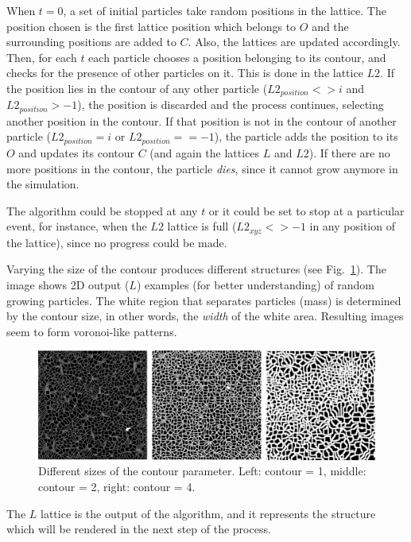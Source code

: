 \documentclass[oneside,a4paper,english,links]{amca}
\begin{document}
When $t = 0$, a set of initial particles take random positions in the lattice. The position chosen is the first lattice position which belongs to $O$ and the surrounding positions are added to $C$. Also, the lattices are updated accordingly. Then, for each $t$ each particle chooses a position belonging to its contour, and checks for the presence of other particles on it. This is done in the lattice $L2$. If the position lies in the contour of any other particle ($L2_{position} <> i$ and $L2_{position} > -1$), the position is discarded and the process continues, selecting another position in the contour. If that position is not in the contour of another particle ($L2_{position} = i$ or $L2_{position} == -1$), the particle adds the position to its $O$ and updates its contour $C$ (and again the lattices $L$ and $L2$). If there are no more positions in the contour, the particle {\em dies}, since it cannot grow anymore in the simulation.

The algorithm could be stopped at any $t$ or it could be set to stop at a particular event, for instance, when the $L2$ lattice is full ($L2_{xyz} <> -1$ in any position of the lattice), since no progress could be made.

Varying the size of the contour produces different structures (see Fig.~\ref{fg:fig1}). The image shows 2D output ($L$) examples (for better understanding) of random growing particles. The white region that separates particles (mass) is determined by the contour size, in other words, the {\em width} of the white area. Resulting images seem to form voronoi-like patterns.


\begin{figure}[htb!]
  \centerline{\includegraphics[scale=0.22]{fig1.pdf}}
  \caption{Different sizes of the contour parameter. Left: contour = 1, middle: contour = 2, right: contour = 4.}
  \label{fg:fig1}
\end{figure}

The $L$ lattice is the output of the algorithm, and it represents the structure which will be rendered in the next step of the process.
\end{document}
